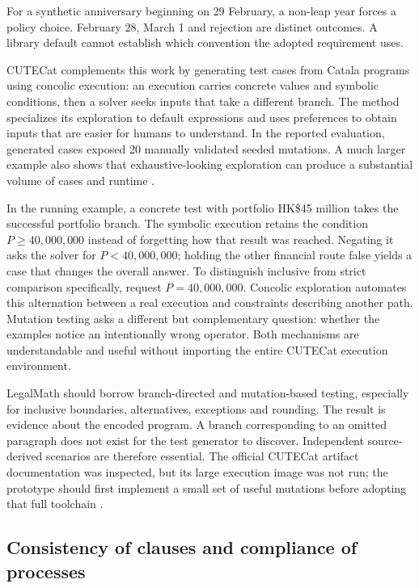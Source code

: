 \documentclass[12pt,a4paper,oneside,openany]{book}
\begin{document}
For a synthetic anniversary beginning on 29 February, a non-leap year forces a policy choice. February 28, March 1 and rejection are distinct outcomes. A library default cannot establish which convention the adopted requirement uses.


CUTECat complements this work by generating test cases from Catala programs using
concolic execution: an execution carries concrete values and symbolic conditions,
then a solver seeks inputs that take a different branch. The method specializes
its exploration to default expressions and uses preferences to obtain inputs
that are easier for humans to understand. In the reported evaluation, generated
cases exposed 20 manually validated seeded mutations. A much larger example also
shows that exhaustive-looking exploration can produce a substantial volume of
cases and runtime \citep[secs.~3--5]{cutecat2025}.

In the running example, a concrete test with portfolio HK\$45 million takes
the successful portfolio branch. The symbolic execution retains the condition
$P\geq 40{,}000{,}000$ instead of forgetting how that result was reached.
Negating it asks the solver for $P<40{,}000{,}000$; holding the other financial
route false yields a case that changes the overall answer. To distinguish
inclusive from strict comparison specifically, request $P=40{,}000{,}000$.
Concolic exploration automates this alternation between a real execution and
constraints describing another path. Mutation testing asks a different but
complementary question: whether the examples notice an intentionally wrong
operator. Both mechanisms are understandable and useful without importing
the entire CUTECat execution environment.

LegalMath should borrow branch-directed and mutation-based testing, especially
for inclusive boundaries, alternatives, exceptions and rounding. The result is
evidence about the encoded program. A branch corresponding to an omitted
paragraph does not exist for the test generator to discover. Independent
source-derived scenarios are therefore essential. The official CUTECat artifact
documentation was inspected, but its large execution image was not run; the
prototype should first implement a small set of useful mutations before adopting
that full toolchain \citep{libraryreview}.

\subsection{Consistency of clauses and compliance of processes}
\label{merge:P-02-literature:06}
\end{document}

